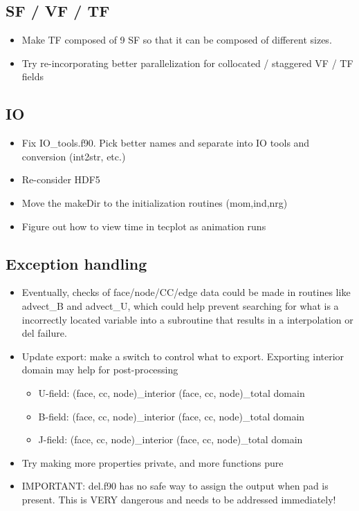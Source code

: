 \documentclass[11pt]{article}
\begin{document}
\subsection{SF / VF / TF}
\begin{itemize}
\setlength\itemsep{-1em}
\item Make TF composed of 9 SF so that it can be composed of different sizes.
\item Try re-incorporating better parallelization for collocated / staggered VF / TF fields
\end{itemize}

\subsection{IO}
\begin{itemize}
\setlength\itemsep{-1em}
\item Fix IO\_tools.f90. Pick better names and separate into IO tools and conversion (int2str, etc.)
\item Re-consider HDF5
\item Move the makeDir to the initialization routines (mom,ind,nrg)
\item Figure out how to view time in tecplot as animation runs
\end{itemize}

\subsection{Exception handling}
\begin{itemize}
\setlength\itemsep{-1em}
\item Eventually, checks of face/node/CC/edge data could be made in routines like advect\_B and advect\_U, which could help prevent searching for what is a incorrectly located variable into a subroutine that results in a interpolation or del failure.
\item Update export: make a switch to control what to export. Exporting interior domain may help for post-processing
\begin{itemize}
\setlength\itemsep{-1em}
\item U-field: (face, cc, node)\_interior (face, cc, node)\_total domain
\item B-field: (face, cc, node)\_interior (face, cc, node)\_total domain
\item J-field: (face, cc, node)\_interior (face, cc, node)\_total domain
\end{itemize}
\item Try making more properties private, and more functions pure
\item IMPORTANT: del.f90 has no safe way to assign the output when pad is present. This is VERY dangerous and needs to be addressed immediately!
\end{itemize}
\end{document}
